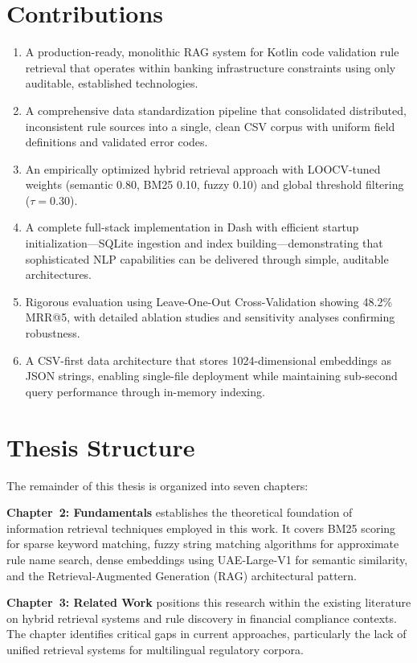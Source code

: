 \section{Contributions}
\begin{enumerate}[leftmargin=*,itemsep=2pt,topsep=2pt]
 \item A production-ready, monolithic RAG system for Kotlin code validation rule retrieval that operates within banking infrastructure constraints using only auditable, established technologies.
 \item A comprehensive data standardization pipeline that consolidated distributed, inconsistent rule sources into a single, clean CSV corpus with uniform field definitions and validated error codes.
 \item An empirically optimized hybrid retrieval approach with LOOCV-tuned weights (semantic 0.80, BM25 0.10, fuzzy 0.10) and global threshold filtering ($\tau{=}0.30$).
 \item A complete full-stack implementation in Dash with efficient startup initialization—SQLite ingestion and index building—demonstrating that sophisticated NLP capabilities can be delivered through simple, auditable architectures.
 \item Rigorous evaluation using Leave-One-Out Cross-Validation showing 48.2\% MRR@5, with detailed ablation studies and sensitivity analyses confirming robustness.
 \item A CSV-first data architecture that stores 1024-dimensional embeddings as JSON strings, enabling single-file deployment while maintaining sub-second query performance through in-memory indexing.
\end{enumerate}

\section{Thesis Structure}

The remainder of this thesis is organized into seven chapters:

\textbf{Chapter~2: Fundamentals} establishes the theoretical foundation of information retrieval techniques employed in this work. It covers BM25 scoring for sparse keyword matching, fuzzy string matching algorithms for approximate rule name search, dense embeddings using UAE-Large-V1 for semantic similarity, and the Retrieval-Augmented Generation (RAG) architectural pattern.

\textbf{Chapter~3: Related Work} positions this research within the existing literature on hybrid retrieval systems and rule discovery in financial compliance contexts. The chapter identifies critical gaps in current approaches, particularly the lack of unified retrieval systems for multilingual regulatory corpora.

